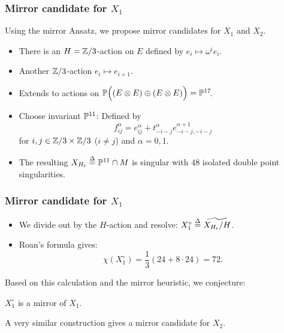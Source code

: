 \begin{frame}
\frametitle{Mirror candidate for $X_1$}

Using the mirror Ansatz, we propose mirror candidates for $X_1$ and $X_2$.

\begin{itemize}
	\item
	There is an $H = \Z/3$-action on $E$ defined by $e_i \mapsto \omega^i e_i$.
	\pause

	\item
	Another $\Z/3$-action $e_i \mapsto e_{i + 1}$.
	\pause

	\item
	Extends to actions on $\P\Big((E \otimes E) \oplus (E \otimes E)\Big)=\P^{17}\mkern-4mu$.
	\pause

	\item
	Choose invariant $\P^{11}$: Defined by
	\[
	    f_{ij}^\alpha = e_{ij}^\alpha + t_{-i-j}^\alpha e_{-i-j,-i-j}^{\alpha+1}
	\]
	for $i,j \in \Z/3 \times \Z/3$ ($i \neq j$) and $\alpha = 0,1$.
	\pause

	\item
	The resulting $X_{H_t} \defeq \P^{11} \cap M$ is singular with $48$ isolated double point singularities.
\end{itemize}

\end{frame}

\begin{frame}
\frametitle{Mirror candidate for $X_1$}

\begin{itemize}
	\item We divide out by the $H$-action and resolve: $X_1^\circ \defeq \widetilde{X_{H_t}/H}$.
	\pause
	\item Roan's formula gives:
	\[
	    \chi(X_1^\circ) = \frac{1}{3} \left(24 + 8 \cdot 24\right) = 72.
	\]
\end{itemize}

Based on this calculation and the mirror heuristic, we conjecture:

\begin{conjecture}
    $X_1^\circ$ is a mirror of $X_1$.
\end{conjecture}

\pause
\begin{remark}
    A very similar construction gives a mirror candidate for $X_2$.
\end{remark}

\end{frame}